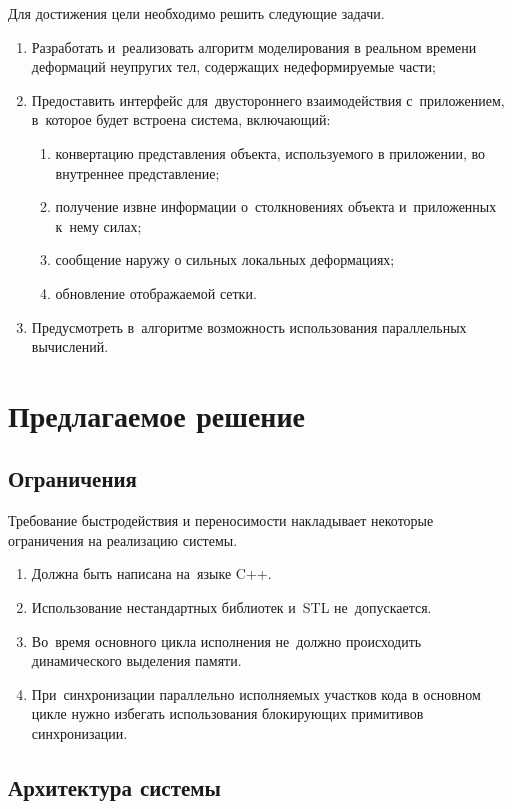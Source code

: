 \documentclass[a4paper, 14pt, titlepage]{extarticle}
\begin{document}
    Для достижения цели необходимо решить следующие задачи.
    \begin{enumerate}
      \item Разработать и~реализовать алгоритм моделирования в реальном времени деформаций
        не\-у\-пру\-гих тел, содержащих недеформируемые части;
      \item Предоставить интерфейс для~двустороннего взаимодействия с~приложением, в~которое будет
        встроена система, включающий:
        \begin{enumerate}
          \item конвертацию представления объекта, используемого в приложении, во внутреннее представление;
          \item получение извне информации о~столкновениях объекта и~приложенных к~нему силах;
          \item сообщение наружу о сильных локальных деформациях;
          \item обновление отображаемой сетки.
        \end{enumerate}
      \item Предусмотреть в~алгоритме возможность использования параллельных вычислений.
    \end{enumerate}

  \section{Предлагаемое решение}
    \subsection{Ограничения}

      Требование быстродействия и переносимости накладывает некоторые ог\-ра\-ни\-че\-ния на реализацию системы.
      \begin{enumerate}
        \item Должна быть написана на~языке C++.
        \item Использование нестандартных библиотек и~STL не~допускается.
        \item Во~время основного цикла исполнения не~должно происходить динамического выделения памяти.
        \item При~синхронизации параллельно исполняемых участков кода в основном цикле нужно
          избегать использования блокирующих примитивов синхронизации.
      \end{enumerate}

    \subsection{Архитектура системы}
\end{document}
